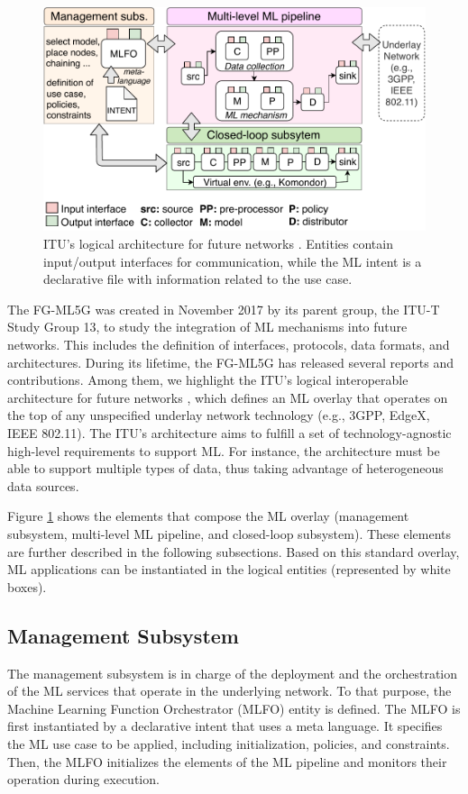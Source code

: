 \documentclass{article}
\begin{document}
\begin{figure}[!ht]
	\centering
	\includegraphics[width=.85\textwidth]{itu_ml_architecture}
	\caption{ITU's logical architecture for future networks \cite{itu2019architecture}. Entities contain input/output interfaces for communication, while the ML intent is a declarative file with information related to the use case.}
	\label{fig:itu_ml_architecture}
\end{figure}

The FG-ML5G was created in November 2017 by its parent group, the ITU-T Study Group 13, to study the integration of ML mechanisms into future networks. This includes the definition of interfaces, protocols, data formats, and architectures. During its lifetime, the FG-ML5G has released several reports and contributions. Among them, we highlight the ITU's logical interoperable architecture for future networks \cite{itu2019architecture}, which defines an ML overlay that operates on the top of any unspecified underlay network technology (e.g., 3GPP, EdgeX, IEEE 802.11). The ITU's architecture aims to fulfill a set of technology-agnostic high-level requirements to support ML. For instance, the architecture must be able to support multiple types of data, thus taking advantage of heterogeneous data sources. 

Figure \ref{fig:itu_ml_architecture} shows the elements that compose the ML overlay (management subsystem, multi-level ML pipeline, and closed-loop subsystem). These elements are further described in the following subsections. Based on this standard overlay, ML applications can be instantiated in the logical entities (represented by white boxes).

\subsection{Management Subsystem} 
The management subsystem is in charge of the deployment and the orchestration of the ML services that operate in the underlying network. To that purpose, the Machine Learning Function Orchestrator (MLFO) entity is defined. The MLFO is first instantiated by a declarative intent that uses a meta language. It specifies the ML use case to be applied, including initialization, policies, and constraints. Then, the MLFO initializes the elements of the ML pipeline and monitors their operation during execution.
\end{document}
